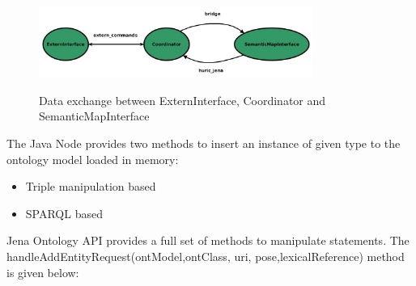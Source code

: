 \begin{figure}[H]
\centering
\includegraphics[width=0.8\textwidth]{imgs/topics2.jpg}
\label{fig:actions}
\caption{Data exchange between ExternInterface, Coordinator and SemanticMapInterface}
\end{figure}


The Java Node provides two methods to insert an instance of given type to the ontology model loaded in memory:
\begin{itemize}
\item Triple manipulation based
\item SPARQL based
\end{itemize}
Jena Ontology API provides a full set of methods to manipulate statements. The handleAddEntityRequest(ontModel,ontClass, uri, pose,lexicalReference) method is given below:

